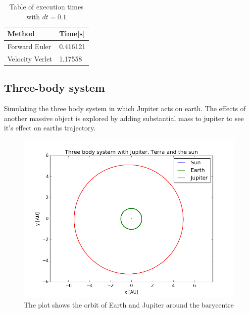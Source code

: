 \begin{table}
\centering
\caption{Table of execution times with $dt = 0.1$ }\label{tab:time}
\begin{tabular}{|l|l|}\label{tab:time}
\hline
\textbf{Method}  & \textbf{Time[s]} \\
\hline
Forward Euler   & 0.416121 \\
\hline
Velocity Verlet & 1.17558 \\
\hline
\end{tabular}
\end{table}

\subsection{Three-body system}
Simulating the three body system in which Jupiter acts on earth. The effects of another massive object is explored by adding substantial mass to jupiter to see it's effect on earths trajectory.
 
\begin{figure}[H]
\includegraphics[scale=0.7]{figures/three_body}
\caption{The plot shows the orbit of Earth and Jupiter around the barycentre }\label{fig:three}
\end{figure}

